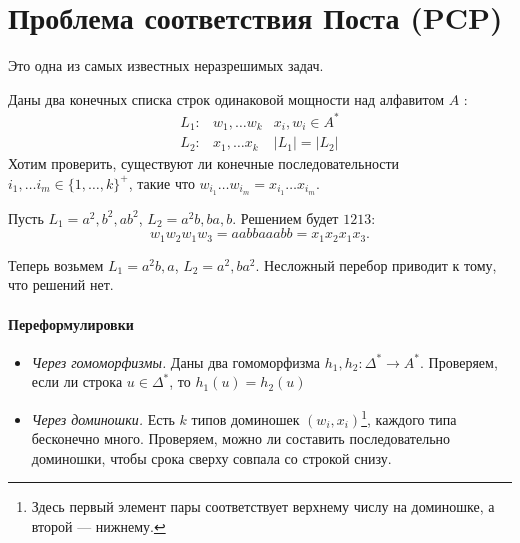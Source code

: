 \section{Проблема соответствия Поста (PCP)}
Это одна из самых известных неразрешимых задач.

\begin{desc}
Даны два конечных списка строк одинаковой мощности над алфавитом $ A$ :
\[
\begin{aligned}
	L_1\colon & w_1, \ldots w_k & x_i, w_i \in A^{*} \\
	L_2\colon  & x_1, \ldots x_k & \lvert L_1 \rvert = \lvert L_2 \rvert  
\end{aligned}
\]
Хотим проверить, существуют ли конечные последовательности $  i_1, \ldots i_m \in \{1, \ldots , k\}^+$, такие что $ w_{i_1}\ldots w_{i_m} = x_{i_1}\ldots x_{i_m}$.
\end{desc}

\begin{ex}
    Пусть $  L_1 = a^2, b^2, ab ^2$, $  L_2 = a^2b, ba, b$. Решением будет $ 1213$:
	 \[
	w_1 w_2 w_1 w_3 = aabbaaabb = x_1x_2x_1x_3
	.\] 
\end{ex}

\begin{ex}
    Теперь возьмем  $  L_1 = a^2b, a$, $  L_2 = a^2, ba^2$. Несложный перебор приводит к тому, что решений нет.
\end{ex}

\paragraph{Переформулировки}
\begin{itemize}
	\item \textit{Через гомоморфизмы.} Даны два гомоморфизма $ h_1, h_2\colon \Delta^{*} \to A^{*}$.
		Проверяем, если ли строка $ u \in \Delta^{*}$, то $ h_1(u) = h_2(u)$ 
	\item \textit{Через доминошки.} Есть $ k$ типов доминошек  $(w_i, x_i)$\footnote{Здесь первый элемент пары соответствует верхнему числу на доминошке, а второй --- нижнему.}, каждого типа бесконечно много. Проверяем, можно ли составить последовательно доминошки, чтобы срока сверху совпала со строкой снизу.
\end{itemize}


